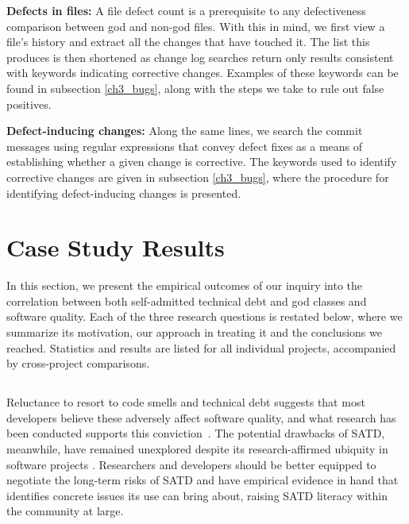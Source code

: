 \noindent\textbf{Defects in files:}
A file defect count is a prerequisite to any defectiveness comparison between god and non-god files. With this in mind, we first view a file's history and extract all the changes that have touched it. The list this produces is then shortened as change log searches return only results consistent with keywords indicating corrective changes.
Examples of these keywords can be found in subsection \ref{ch3_bugs}, along with the steps we take to rule out false positives.


\noindent \textbf{Defect-inducing changes:}
Along the same lines, we search the commit messages using regular expressions that convey defect fixes as a means of establishing whether a given change is corrective. The keywords used to identify corrective changes are given in subsection \ref{ch3_bugs}, where the procedure for identifying defect-inducing changes is presented.

\section{Case Study Results}
\label{chap4:sec:case_study_results}

In this section, we present the empirical outcomes of our inquiry into the correlation between both self-admitted technical debt and god classes and software quality. Each of the three research questions is restated below, where we summarize its motivation, our approach in treating it and the conclusions we reached. Statistics and results are listed for all individual projects, accompanied by cross-project comparisons.

\subsection*{\chapterIVrqI}


Reluctance to resort to code smells and technical debt suggests that most developers believe these adversely affect software quality, and what research has been conducted supports this conviction~\cite{zazworka2011investigating}. %
The potential drawbacks of SATD, meanwhile, have remained unexplored despite its research-affirmed ubiquity in software projects \cite{ICSM_PotdarS14}. Researchers and developers should be better equipped to negotiate the long-term risks of SATD and have empirical evidence in hand that identifies concrete issues its use can bring about, raising SATD literacy within the community at large.


